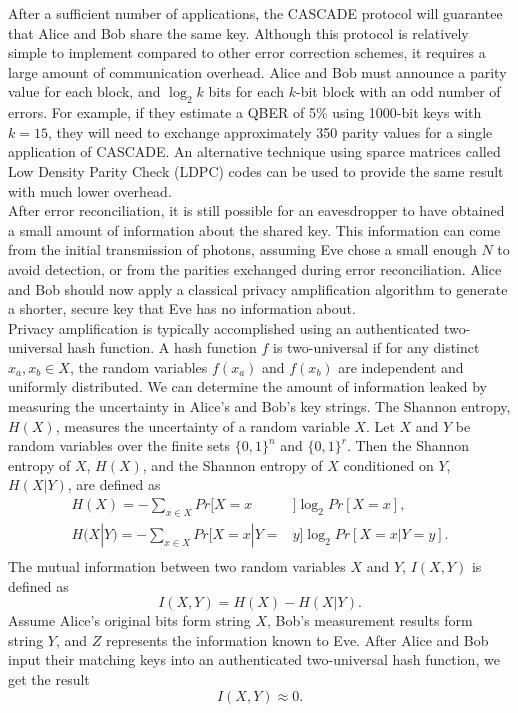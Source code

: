 \documentclass[conference]{IEEEtran}
\begin{document}
After a sufficient number of applications, the CASCADE protocol will guarantee that Alice and Bob share the same key. Although this protocol is relatively simple to implement compared to other error correction schemes, it requires a large amount of communication overhead. Alice and Bob must announce a parity value for each block, and $\log_2 k$ bits for each $k$-bit block with an odd number of errors. For example, if they estimate a QBER of 5\% using 1000-bit keys with $k=15$, they will need to exchange approximately 350 parity values for a single application of CASCADE\cite{Johnson}. An alternative technique using sparce matrices called Low Density Parity Check (LDPC) codes\cite{Gallager} can be used to provide the same result with much lower overhead\cite{MacKay}.\\

After error reconciliation, it is still possible for an eavesdropper to have obtained a small amount of information about the shared key. This information can come from the initial transmission of photons, assuming Eve chose a small enough $N$ to avoid detection, or from the parities exchanged during error reconciliation. Alice and Bob should now apply a classical privacy amplification algorithm to generate a shorter, secure key that Eve has no information about.\\

Privacy amplification is typically accomplished using an authenticated two-universal hash function. A hash function $f$ is two-universal if for any distinct $x_a,x_b\in X$, the random variables $f(x_a)$ and $f(x_b)$ are independent and uniformly distributed\cite{Renner}. We can determine the amount of information leaked by measuring the uncertainty in Alice's and Bob's key strings. The Shannon entropy, $H(X)$, measures the uncertainty of a random variable $X$. Let $X$ and $Y$ be random variables over the finite sets $\{0,1\}^n$ and $\{0,1\}^r$. Then the Shannon entropy of $X$, $H(X)$, and the Shannon entropy of $X$ conditioned on $Y$, $H(X|Y)$, are defined as
\begin{equation*}
  \begin{split}
    H(X) = -\sum_{x\in X}Pr[X = x&]\log_2 Pr[X = x],\\
    H(X|Y) = -\sum_{x\in X}Pr[X = x|Y =& y]\log_2 Pr[X = x|Y = y].\\
  \end{split}
\end{equation*}
The mutual information\cite{Ribeiro} between two random variables $X$ and $Y$, $I(X,Y)$ is defined as \[ I(X,Y) = H(X) - H(X|Y). \]Assume Alice's original bits form string $X$, Bob's measurement results form string $Y$, and $Z$ represents the information known to Eve. After Alice and Bob input their matching keys into an authenticated two-universal hash function, we get the result \[ I(X,Y)\approx 0. \]\\
\end{document}
